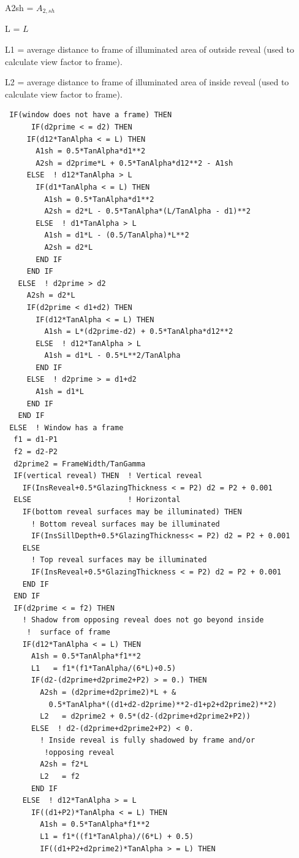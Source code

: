 A2sh = \({A_{2,sh}}\)

L = \(L\)

L1 = average distance to frame of illuminated area of outside reveal (used to calculate view factor to frame).

L2 = average distance to frame of illuminated area of inside reveal (used to calculate view factor to frame).

\begin{lstlisting}
 IF(window does not have a frame) THEN
      IF(d2prime < = d2) THEN
     IF(d12*TanAlpha < = L) THEN
       A1sh = 0.5*TanAlpha*d1**2
       A2sh = d2prime*L + 0.5*TanAlpha*d12**2 - A1sh
     ELSE  ! d12*TanAlpha > L
       IF(d1*TanAlpha < = L) THEN
         A1sh = 0.5*TanAlpha*d1**2
         A2sh = d2*L - 0.5*TanAlpha*(L/TanAlpha - d1)**2
       ELSE  ! d1*TanAlpha > L
         A1sh = d1*L - (0.5/TanAlpha)*L**2
         A2sh = d2*L
       END IF
     END IF
   ELSE  ! d2prime > d2
     A2sh = d2*L
     IF(d2prime < d1+d2) THEN
       IF(d12*TanAlpha < = L) THEN
         A1sh = L*(d2prime-d2) + 0.5*TanAlpha*d12**2
       ELSE  ! d12*TanAlpha > L
         A1sh = d1*L - 0.5*L**2/TanAlpha
       END IF
     ELSE  ! d2prime > = d1+d2
       A1sh = d1*L
     END IF
   END IF
 ELSE  ! Window has a frame
  f1 = d1-P1
  f2 = d2-P2
  d2prime2 = FrameWidth/TanGamma
  IF(vertical reveal) THEN  ! Vertical reveal
    IF(InsReveal+0.5*GlazingThickness < = P2) d2 = P2 + 0.001
  ELSE                      ! Horizontal
    IF(bottom reveal surfaces may be illuminated) THEN
      ! Bottom reveal surfaces may be illuminated
      IF(InsSillDepth+0.5*GlazingThickness< = P2) d2 = P2 + 0.001
    ELSE
      ! Top reveal surfaces may be illuminated
      IF(InsReveal+0.5*GlazingThickness < = P2) d2 = P2 + 0.001
    END IF
  END IF
  IF(d2prime < = f2) THEN
    ! Shadow from opposing reveal does not go beyond inside
     !  surface of frame
    IF(d12*TanAlpha < = L) THEN
      A1sh = 0.5*TanAlpha*f1**2
      L1   = f1*(f1*TanAlpha/(6*L)+0.5)
      IF(d2-(d2prime+d2prime2+P2) > = 0.) THEN
        A2sh = (d2prime+d2prime2)*L + &
          0.5*TanAlpha*((d1+d2-d2prime)**2-d1+p2+d2prime2)**2)
        L2   = d2prime2 + 0.5*(d2-(d2prime+d2prime2+P2))
      ELSE  ! d2-(d2prime+d2prime2+P2) < 0.
        ! Inside reveal is fully shadowed by frame and/or
         !opposing reveal
        A2sh = f2*L
        L2   = f2
      END IF
    ELSE  ! d12*TanAlpha > = L
      IF((d1+P2)*TanAlpha < = L) THEN
        A1sh = 0.5*TanAlpha*f1**2
        L1 = f1*((f1*TanAlpha)/(6*L) + 0.5)
        IF((d1+P2+d2prime2)*TanAlpha > = L) THEN

\end{lstlisting}
